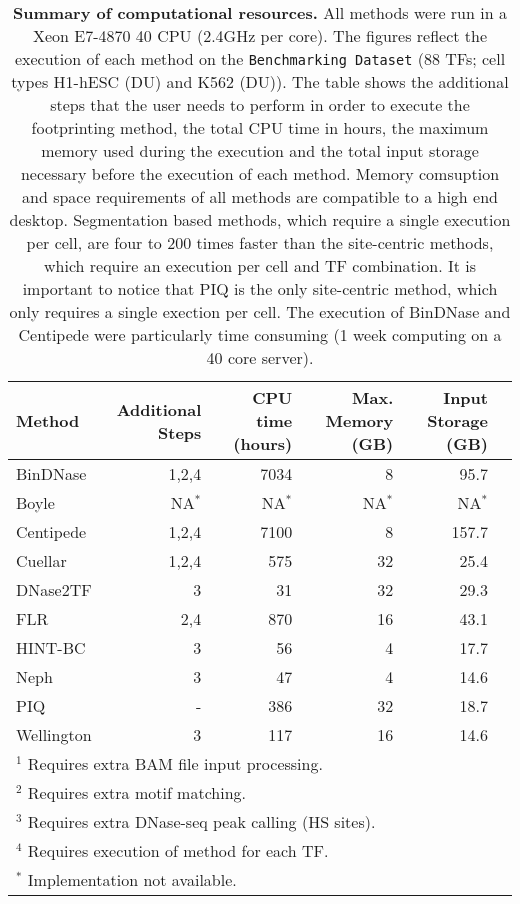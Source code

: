 \documentclass[11pt]{article}
\begin{document}

\setcounter{table}{0}

\begin{table}[h]
\begin{center}
\caption{\textbf{Summary of computational resources.} All methods were run in a Xeon E7-4870 40 CPU (2.4GHz per core). The figures reflect the execution of each method on the {\tt Benchmarking Dataset} (88 TFs; cell types H1-hESC (DU) and K562 (DU)). The table shows the additional steps that the user needs to perform in order to execute the footprinting method, the total CPU time in hours, the maximum memory used during the execution and the total input storage necessary before the execution of each method. Memory comsuption and space requirements of all methods are compatible to a high end desktop. Segmentation based methods, which require a single execution per cell, are four to 200 times faster than the site-centric methods, which require an execution per cell and TF combination. It is important to notice that PIQ is the only site-centric method, which only requires a single exection per cell. The execution of BinDNase and Centipede were particularly time consuming (1 week computing on a 40 core server).}
\label{tab:comp.resource}
\renewcommand{\arraystretch}{1.2}
\begin{tabularx}{\textwidth}{ lrrrrr }
\hline
Method & Additional Steps & CPU time (hours) & Max. Memory (GB) & Input Storage (GB) \\
\hline
BinDNase & 1,2,4 & 7034 & 8 & 95.7 \\
Boyle & NA$^*$ & NA$^*$ & NA$^*$ & NA$^*$ \\
Centipede & 1,2,4 & 7100 & 8 & 157.7 \\
Cuellar & 1,2,4 & 575 & 32 & 25.4 \\
DNase2TF & 3 & 31 & 32 & 29.3 \\
FLR & 2,4 & 870 & 16 & 43.1 \\
HINT-BC & 3 & 56 & 4 & 17.7 \\
Neph & 3 & 47 & 4 & 14.6 \\
PIQ & - & 386 & 32 & 18.7 \\
Wellington & 3 & 117 & 16 & 14.6 \\
\hline
\multicolumn{6}{l}{$^1$ Requires extra BAM file input processing.} \\
\multicolumn{6}{l}{$^2$ Requires extra motif matching.} \\
\multicolumn{6}{l}{$^3$ Requires extra DNase-seq peak calling (HS sites).} \\
\multicolumn{6}{l}{$^4$ Requires execution of method for each TF.} \\
\multicolumn{6}{l}{$^*$ Implementation not available.} \\
\end{tabularx}
\end{center}
\end{table}
\end{document}
